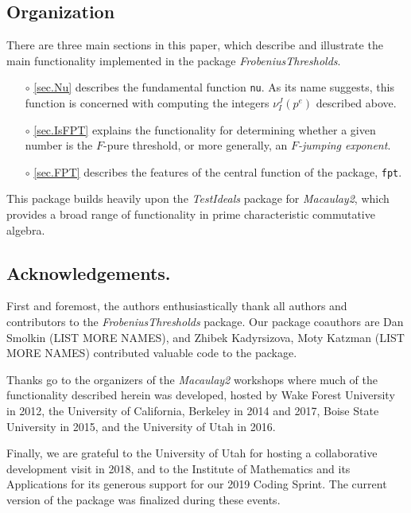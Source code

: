 \documentclass{amsart}
\begin{document}
\subsection*{Organization}

There are three main sections in this paper, which describe and illustrate the main functionality implemented in the package \emph{FrobeniusThresholds}.
\begin{itemize}
\item[$\circ$] \autoref{sec.Nu} describes the fundamental function {\tt nu}.  As its name suggests, this function is concerned with computing the integers $\nu_I^J(p^e)$ described above.
\item[$\circ$] \autoref{sec.IsFPT} explains the functionality for determining whether a given number is the $F$-pure threshold, or more generally, an \emph{$F$-jumping exponent}.
\item[$\circ$] \autoref{sec.FPT} describes the features of the central function of the package, {\tt fpt}.
\end{itemize}
This package builds heavily upon the \emph{TestIdeals} package for \emph{Macaulay2}, which provides a broad range of functionality in prime characteristic commutative algebra.

\subsection*{Acknowledgements.}  First and foremost, the authors enthusiastically thank all authors and contributors to the \emph{FrobeniusThresholds} package.
Our package coauthors are Dan Smolkin {\color{red}(LIST MORE NAMES)}, and Zhibek Kadyrsizova, Moty Katzman {\color{red} (LIST MORE NAMES)} contributed valuable code to the package.

Thanks go to the organizers of the \emph{Macaulay2} workshops where much of the functionality described herein was developed, hosted by Wake Forest University in 2012, the University of California, Berkeley in 2014 and 2017, Boise State University in 2015, and the University of Utah in 2016.

Finally, we are grateful to the University of Utah for hosting a collaborative development visit in 2018, and to the Institute of Mathematics and its Applications for its generous support for our 2019 Coding Sprint.
The current version of the package was finalized during these events.
\end{document}
